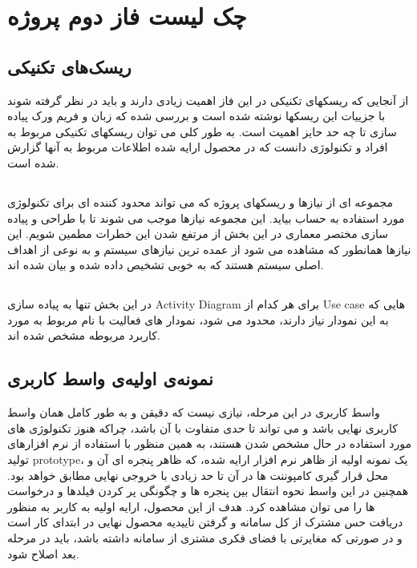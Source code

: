 \section{چک لیست فاز دوم پروژه}
\subsection*{ریسک‌های تکنیکی}
از آنجایی که ریسکهای تکنیکی در این فاز اهمیت زیادی دارند و باید در نظر گرفته شوند با جزییات این ریسکها نوشته شده است و بررسی شده که زبان و فریم ورک پیاده سازی تا چه حد حایز اهمیت است. به طور کلی می توان ریسکهای تکنیکی مربوط به افراد و تکنولوژی دانست که در محصول ارایه شده اطلاعات مربوط به آنها گزارش شده است.
\subsection*{}
مجموعه ای از نیازها و ریسکهای پروژه که می تواند محدود کننده ای برای تکنولوژی مورد استفاده به حساب بیاید. این مجموعه نیازها موجب می شوند تا با طراحی و پیاده سازی مختصر معماری در این بخش از مرتفع شدن این خطرات مطمین شویم. این نیازها همانطور که مشاهده می شود از عمده ترین نیازهای سیستم و به نوعی از اهداف اصلی سیستم هستند که به خوبی تشخیص داده شده و بیان شده اند.
\subsection*{}
در این بخش تنها به پیاده سازی Activity Diagram برای هر کدام از Use case هایی که به این نمودار نیاز دارند، محدود می شود، نمودار های فعالیت با نام مربوط به مورد کاربرد مربوطه مشخص شده اند.
\subsection*{نمونه‌ی اولیه‌ی واسط کاربری}
واسط کاربری در این مرحله، نیازی نیست که دقیقن و به طور کامل همان واسط کاربری نهایی باشد و می تواند تا حدی متفاوت با آن باشد، چراکه هنوز تکنولوژی های مورد استفاده در حال مشخص شدن هستند، به همین منظور با استفاده از نرم افزارهای تولید prototype، یک نمونه اولیه از ظاهر نرم افزار ارایه شده، که ظاهر پنجره ای آن و محل قرار گیری کامپوننت ها در آن تا حد زیادی با خروجی نهایی مطابق خواهد بود. همچنین در این واسط نحوه انتقال بین پنجره ها و چگونگی پر کردن فیلدها و درخواست ها را می توان مشاهده کرد. هدف از این محصول، ارایه اولیه به کاربر به منظور دریافت حس مشترک از کل سامانه و گرفتن تاییدیه محصول نهایی در ابتدای کار است و در صورتی که مغایرتی با فضای فکری مشتری از سامانه داشته باشد، باید در مرحله بعد اصلاح شود.
